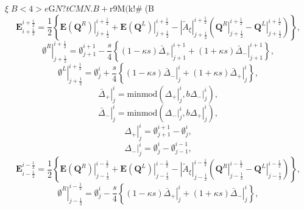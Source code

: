 $\xi$$B<4>e$G$N?tCMN.B+$r9M$($k!#(B
\begin{equation}
 \bm{E}^{i+\frac{1}{2}}_{i+\frac{1}{2}} =
  \frac{1}{2}\left\{\left.\bm{E}(\bm{Q}^R)\right|^{i+\frac{1}{2}}_{j+\frac{1}{2}} +
	     \left.\bm{E}(\bm{Q}^L)\right|^{i+\frac{1}{2}}_{j+\frac{1}{2}} -
	     \left|\tilde{A}_\xi\right|^{i+\frac{1}{2}}_{j+\frac{1}{2}}
	     \left(\left.\bm{Q}^R\right|^{i+\frac{1}{2}}_{j+\frac{1}{2}} -
	     \left.\bm{Q}^L\right|^{i+\frac{1}{2}}_{j+\frac{1}{2}}\right)\right\},
\end{equation}
\begin{equation}
 \left.\emptyset^R\right|^{i+\frac{1}{2}}_{j+\frac{1}{2}} = \emptyset^{i+1}_{j+1}
  - \frac{s}{4}\left\{(1-\kappa	s)\left.\bar{\Delta}_+\right|^{i+1}_{j+1} +
	       (1+\kappa s)\left.\bar{\Delta}_-\right|^{i+1}_{j+1}\right\},
\end{equation}
\begin{equation}
 \left.\emptyset^L\right|^{i+\frac{1}{2}}_{j+\frac{1}{2}} = \emptyset^{i}_{j}
  + \frac{s}{4}\left\{(1-\kappa	s)\left.\bar{\Delta}_-\right|^{i}_{j} +
		(1+\kappa s)\left.\bar{\Delta}_+\right|^{i}_{j}\right\},
\end{equation}
\begin{equation}
 \left.\bar{\Delta}_+\right|^i_j = \text{minmod} 
  \left(\left.\Delta_+\right|^i_j, b\left.\Delta_-\right|^i_j\right),
\end{equation}
\begin{equation}
 \left.\bar{\Delta}_-\right|^i_j = \text{minmod} 
  \left(\left.\Delta_-\right|^i_j, b\left.\Delta_+\right|^i_j\right),
\end{equation}
\begin{equation}
 \left.\Delta_+\right|^i_j = \emptyset^{i+1}_{j+1} - \emptyset^i_j,
\end{equation}
\begin{equation}
 \left.\Delta_-\right|^i_j = \emptyset^i_j - \emptyset^{i-1}_{j-1},
\end{equation}
\begin{equation}
 \bm{E}^{i-\frac{1}{2}}_{i-\frac{1}{2}} =
  \frac{1}{2}\left\{\left.\bm{E}(\bm{Q}^R)\right|^{i-\frac{1}{2}}_{j-\frac{1}{2}} +
	     \left.\bm{E}(\bm{Q}^L)\right|^{i-\frac{1}{2}}_{j-\frac{1}{2}} -
	     \left|\tilde{A}_\xi\right|^{i-\frac{1}{2}}_{j-\frac{1}{2}}
	     \left(\left.\bm{Q}^R\right|^{i-\frac{1}{2}}_{j-\frac{1}{2}} -
	     \left.\bm{Q}^L\right|^{i-\frac{1}{2}}_{j-\frac{1}{2}}\right)\right\},
\end{equation}
\begin{equation}
 \left.\emptyset^R\right|^{i-\frac{1}{2}}_{j-\frac{1}{2}} = \emptyset^{i}_{j}
  - \frac{s}{4}\left\{(1-\kappa	s)\left.\bar{\Delta}_+\right|^{i}_{j} +
	       (1+\kappa s)\left.\bar{\Delta}_-\right|^{i}_{j}\right\},
\end{equation}
